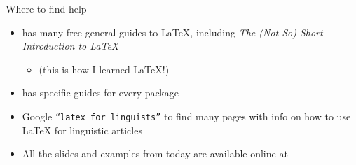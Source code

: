 \documentclass{beamer}
\begin{document}
\begin{frame}{Where to find help}
	\begin{itemize}
	\pause
	\item {} has many free general guides to LaTeX, including \textit{The (Not So) Short Introduction to LaTeX}
		\begin{itemize}\item (this is how I learned LaTeX!)\end{itemize}
	\pause
	\item {} has specific guides for every package
	\pause
	\item Google \texttt{``latex for linguists''} to find many pages with info on how to use LaTeX for linguistic articles
	\pause
	\item All the slides and examples from today are available online at 
	\end{itemize}
\end{frame}
\end{document}
